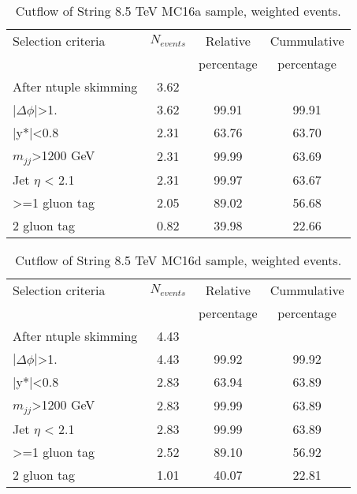 \begin{table}[ht]
\begin{center}
\begin{tabular}{|l|c|c|c|}
\hline
Selection criteria & $N_{events}$ & Relative & Cummulative \\
 & & percentage & percentage \\
\hline
After ntuple skimming & 3.62 &  &  \\
$|\Delta\phi|$>1. & 3.62 & 99.91 & 99.91 \\
|y*|<0.8 & 2.31 & 63.76 & 63.70 \\
$m_{jj}$>1200 GeV & 2.31 & 99.99 & 63.69 \\
Jet $\eta$ < 2.1 & 2.31 & 99.97 & 63.67 \\
>=1 gluon tag & 2.05 & 89.02 & 56.68 \\
2 gluon tag & 0.82 & 39.98 & 22.66 \\
\hline
\end{tabular}
\end{center}
\caption{Cutflow of String 8.5 TeV MC16a sample, weighted events.}
\end{table}

\begin{table}[ht]
\begin{center}
\begin{tabular}{|l|c|c|c|}
\hline
Selection criteria & $N_{events}$ & Relative & Cummulative \\
 & & percentage & percentage \\
\hline
After ntuple skimming & 4.43 &  &  \\
$|\Delta\phi|$>1. & 4.43 & 99.92 & 99.92 \\
|y*|<0.8 & 2.83 & 63.94 & 63.89 \\
$m_{jj}$>1200 GeV & 2.83 & 99.99 & 63.89 \\
Jet $\eta$ < 2.1 & 2.83 & 99.99 & 63.89 \\
>=1 gluon tag & 2.52 & 89.10 & 56.92 \\
2 gluon tag & 1.01 & 40.07 & 22.81 \\
\hline
\end{tabular}
\end{center}
\caption{Cutflow of String 8.5 TeV MC16d sample, weighted events.}
\end{table}

